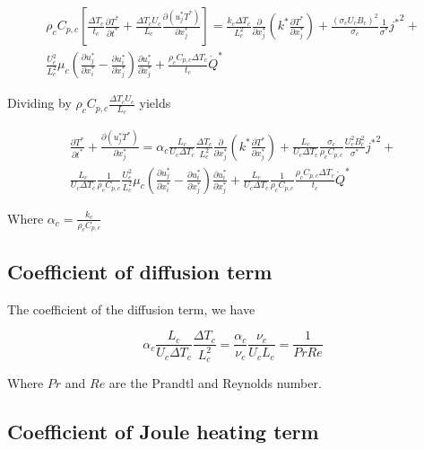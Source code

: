 \documentclass[11pt]{article}
\begin{document}
\begin{multline}
	\rho_c C_{p,c}
	\left[
	\frac{\Delta T_c}{t_c}
	\frac{\partial T^*}{\partial t^*} +
	\frac{\Delta T_c U_c}{L_c}
	\frac{\partial (u_j^* T^*)}{\partial x_j^*}
	\right]
	= 
	\frac{k_c \Delta T_c}{L_c^2}
	\frac{\partial}{\partial x_j^*}
	\left( 
	k^* \frac{\partial T^*}{\partial x_j^*}
	\right) +
	\frac{(\sigma_c U_c B_c)^2}{\sigma_c}
	\frac{1}{\sigma^*} {j^*}^2 + \\
	\frac{U_c^2}{L_c^2}\mu_c
	\left(
	\frac{\partial u_j^*}{\partial x_i^*}
	-
	\frac{\partial u_i^*}{\partial x_j^*}
	\right)
	\frac{\partial u_i^*}{\partial x_j^*} +
	\frac{\rho_c C_{p,c} \Delta T_c}{t_c}
	\dot{Q}^*
\end{multline}

Dividing by $\rho_c C_{p,c} \frac{\Delta T_c U_c}{L_c}$ yields

\begin{multline}
	\frac{\partial T^*}{\partial t^*} +
	\frac{\partial (u_j^* T^*)}{\partial x_j^*}
	= 
	\alpha_c 
	\frac{L_c}{U_c \Delta T_c}
	\frac{\Delta T_c}{L_c^2}
	\frac{\partial}{\partial x_j^*}
	\left( 
	k^* \frac{\partial T^*}{\partial x_j^*}
	\right) + 
	\frac{L_c}{U_c \Delta T_c}
	\frac{\sigma_c}{\rho_c C_{p,c}}
	\frac{U_c^2 B_c^2}{\sigma^*} {j^*}^2 + \\
	\frac{L_c}{U_c \Delta T_c}
	\frac{1}{\rho_c C_{p,c}}
	\frac{U_c^2}{L_c^2}\mu_c
	\left(
	\frac{\partial u_j^*}{\partial x_i^*}
	-
	\frac{\partial u_i^*}{\partial x_j^*}
	\right)
	\frac{\partial u_i^*}{\partial x_j^*} +
	\frac{L_c}{U_c \Delta T_c}
	\frac{1}{\rho_c C_{p,c}}
	\frac{\rho_c C_{p,c} \Delta T_c}{t_c}
	\dot{Q}^*
\end{multline}

Where $\alpha_c = \frac{k_c}{\rho_c C_{p,c}}$

\subsection{Coefficient of diffusion term}

The coefficient of the diffusion term, we have

\begin{equation}
	\alpha_c 
	\frac{L_c}{U_c \Delta T_c}
	\frac{\Delta T_c}{L_c^2}
	=
	\frac{\alpha_c}{\nu_c}
	\frac{\nu_c}{U_c L_c}
	=
	\frac{1}{Pr Re}
\end{equation}

Where $Pr$ and $Re$ are the Prandtl and Reynolds number.

\subsection{Coefficient of Joule heating term}
\end{document}
